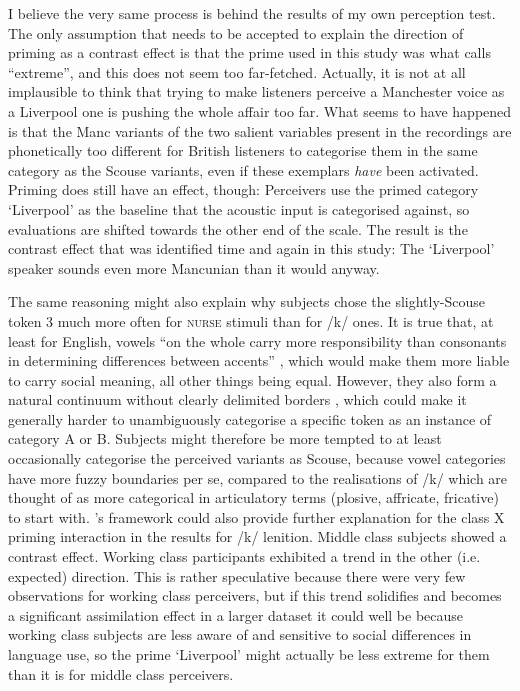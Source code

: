 I believe the very same process is behind the results of my own perception test.
The only assumption that needs to be accepted to explain the direction of priming as a contrast effect is that the prime used in this study was what \citeauthor{herr1986} calls ``extreme'', and this does not seem too far-fetched.
Actually, it is not at all implausible to think that trying to make listeners perceive a Manchester voice as a Liverpool one is pushing the whole affair too far.
What seems to have happened is that the Manc variants of the two salient variables present in the recordings are phonetically too different for British listeners to categorise them in the same category as the Scouse variants, even if these exemplars \emph{have} been activated.
Priming does still have an effect, though: Perceivers use the primed category `Liverpool' as the baseline that the acoustic input is categorised against, so evaluations are shifted towards the other end of the scale.
The result is the contrast effect that was identified time and again in this study: The `Liverpool' speaker sounds even more Mancunian than it would anyway.

The same reasoning might also explain why subjects chose the slightly-Scouse token 3 much more often for \textsc{nurse} stimuli than for /k/ ones.
It is true that, at least for English, vowels ``on the whole carry more responsibility than consonants in determining differences between accents'' \parencite[12]{foulkesdocherty1999a}, which would make them more liable to carry social meaning, all other things being equal.
However, they also form a natural continuum without clearly delimited borders \parencite[cf.][12]{foulkesdocherty1999a}, which could make it generally harder to unambiguously categorise a specific token as an instance of category A or B.
Subjects might therefore be more tempted to at least occasionally categorise the perceived variants as Scouse, because vowel categories have more fuzzy boundaries per se, compared to the realisations of /k/ which are thought of as more categorical in articulatory terms (plosive, affricate, fricative) to start with.
\citeauthor{herr1986}'s framework could also provide further explanation for the class X priming interaction in the results for /k/ lenition.
Middle class subjects showed a contrast effect.
Working class participants exhibited a trend in the other (i.e. expected) direction.
This is rather speculative because there were very few observations for working class perceivers, but if this trend solidifies and becomes a significant assimilation effect in a larger dataset it could well be because working class subjects are less aware of and sensitive to social differences in language use, so the prime `Liverpool' might actually be less extreme for them than it is for middle class perceivers.

